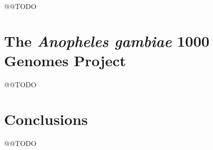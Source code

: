 \documentclass[a4paper,11pt,abstracton,hidelinks]{scrartcl}
\begin{document}
@@TODO


\section{The \textit{Anopheles gambiae} 1000 Genomes Project}


@@TODO


\section{Conclusions}


@@TODO





\printbibliography
\end{document}
